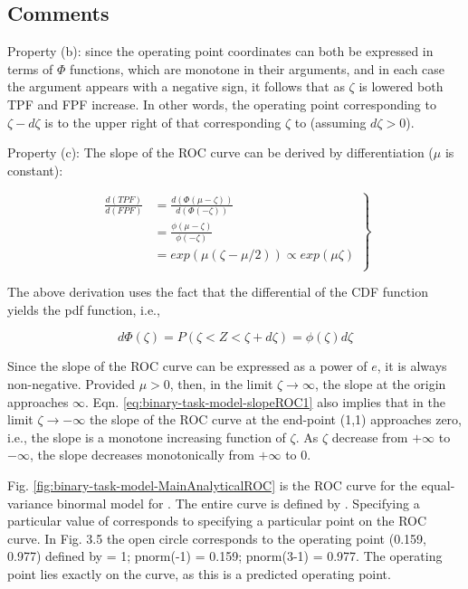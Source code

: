 \documentclass[
]{book}
\begin{document}
\hypertarget{binary-task-model-comments}{%
\subsection{Comments}\label{binary-task-model-comments}}

Property (b): since the operating point coordinates can both be expressed in terms of \(\Phi\) functions, which are monotone in their arguments, and in each case the argument appears with a negative sign, it follows that as \(\zeta\) is lowered both TPF and FPF increase. In other words, the operating point corresponding to \(\zeta - d\zeta\) is to the upper right of that corresponding \(\zeta\) to (assuming \(d\zeta > 0\)).

Property (c): The slope of the ROC curve can be derived by differentiation (\(\mu\) is constant):

\begin{equation} 
\left.
\begin{aligned}
\frac{d(TPF)}{d(FPF)}&=\frac{d(\Phi(\mu-\zeta))}{d(\Phi(-\zeta))}\\
&=\frac{\phi(\mu-\zeta)}{\phi(-\zeta)}\\
&=exp(\mu(\zeta-\mu/2)) \propto exp(\mu \zeta)\\
\end{aligned}
\right \}
\label{eq:binary-task-model-slopeROC1}
\end{equation}

The above derivation uses the fact that the differential of the CDF function yields the pdf function, i.e.,

\[d\Phi(\zeta)=P\left ( \zeta < Z < \zeta + d \zeta \right ) = \phi(\zeta)d\zeta\]

Since the slope of the ROC curve can be expressed as a power of \(e\), it is always non-negative. Provided \(\mu > 0\), then, in the limit \(\zeta\rightarrow \infty\), the slope at the origin approaches \(\infty\). Eqn. \eqref{eq:binary-task-model-slopeROC1} also implies that in the limit \(\zeta\rightarrow -\infty\) the slope of the ROC curve at the end-point (1,1) approaches zero, i.e., the slope is a monotone increasing function of \(\zeta\). As \(\zeta\) decrease from \(+\infty\) to \(-\infty\), the slope decreases monotonically from \(+\infty\) to 0.

Fig. \ref{fig:binary-task-model-MainAnalyticalROC} is the ROC curve for the equal-variance binormal model for . The entire curve is defined by . Specifying a particular value of corresponds to specifying a particular point on the ROC curve. In Fig. 3.5 the open circle corresponds to the operating point (0.159, 0.977) defined by = 1; pnorm(-1) = 0.159; pnorm(3-1) = 0.977. The operating point lies exactly on the curve, as this is a predicted operating point.
\end{document}
